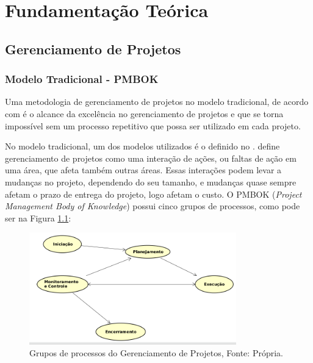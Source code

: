 \chapter[Fundamentação Teórica]{Fundamentação Teórica}
\label{cp:fundamentacao}

\section{Gerenciamento de Projetos}
\label{sec:gerenciamento_de_projetos}

\subsection{Modelo Tradicional - PMBOK}
\label{sec:modelo_tradicional}

Uma metodologia de gerenciamento de projetos no modelo tradicional, de acordo com  é o alcance da excelência no gerenciamento de projetos e que se torna impossível sem um processo repetitivo que possa ser utilizado em cada projeto.

No modelo tradicional, um dos modelos utilizados é o definido no .  define gerenciamento de projetos como uma interação de ações, ou faltas de ação em uma área, que afeta também outras áreas. Essas interações podem levar a mudanças no projeto, dependendo do seu tamanho, e mudanças quase sempre afetam o prazo de entrega do projeto, logo afetam o custo. O PMBOK (\textit{Project Management Body of Knowledge}) possui cinco grupos de processos, como pode ser na Figura \ref{img:fases_pmbok}:

\begin{figure}[H]
	\centering
	\includegraphics[width=0.8\textwidth]{figuras/fases_pmbok.png}
	\caption{Grupos de processos do Gerenciamento de Projetos, Fonte: Própria.}
	\label{img:fases_pmbok}
\end{figure}


